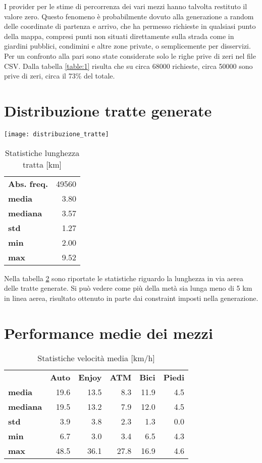 I provider per le stime di percorrenza dei vari mezzi hanno talvolta restituto il valore zero. Questo fenomeno è probabilmente dovuto alla generazione a random delle coordinate di partenza e arrivo, che ha permesso richieste in qualsiasi punto della mappa, compresi punti non situati direttamente sulla strada come in giardini pubblici, condimini e altre zone private, o semplicemente per disservizi. Per un confronto alla pari sono state considerate solo le righe prive di zeri nel file CSV. Dalla tabella \ref{table:1}  risulta che su circa 68000 richieste, circa 50000 sono prive di zeri, circa il 73\% del totale.

\section{Distribuzione tratte generate}

\begin{center}
\texttt{[image: distribuzione\_tratte]}
\end{center}

\begin{table}[H]
	\centering
	\begin{tabular}{ | l r | }
		\hline
		\textbf{Abs. freq.} & 49560 \\
		\textbf{media} & 3.80 \\
		\textbf{mediana} & 3.57 \\
		\textbf{std} & 1.27 \\
		\textbf{min} & 2.00 \\
		\textbf{max} & 9.52 \\
		\hline
	\end{tabular}
	\caption{Statistiche lunghezza tratta [km]}
	\label{table:2}
\end{table}

Nella tabella \ref{table:2} sono riportate le statistiche riguardo la lunghezza in via aerea delle tratte generate. Si può vedere come più della metà sia lunga meno di 5 km in linea aerea, risultato ottenuto in parte dai constraint imposti nella generazione.

\section{Performance medie dei mezzi}

\begin{table}[H]
	\centering
	\begin{tabular}{ | l r r r r r | }
		\hline
		& \textbf{Auto} & \textbf{Enjoy} & \textbf{ATM} & \textbf{Bici} & \textbf{Piedi} \\
		\textbf{media}   & 19.6 & 13.5 &  8.3 & 11.9 & 4.5 \\
		\textbf{mediana} & 19.5 & 13.2 &  7.9 & 12.0 & 4.5 \\
		\textbf{std}     &  3.9 &  3.8 &  2.3 &  1.3 & 0.0 \\
		\textbf{min}     &  6.7 &  3.0 &  3.4 &  6.5 & 4.3 \\
		\textbf{max}     & 48.5 & 36.1 & 27.8 & 16.9 & 4.6 \\
		\hline
	\end{tabular}
	\caption{Statistiche velocità media [km/h]}
	\label{table:2}
\end{table}


